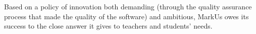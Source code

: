 \documentclass[twocolumn,10pt]{asme2e}
\begin{document}
Based on a policy of innovation both demanding (through the quality assurance process that made the quality of the software) and ambitious, MarkUs owes its success to the close answer it gives to teachers and students' needs. 



%

\end{document}
